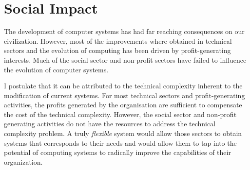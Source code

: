 \section{Social Impact}
The development of computer systems has had far reaching consequences on our
civilization. However, most of the improvements where obtained in technical
sectors and the evolution of computing has been driven by profit-generating
interests. Much of the social sector and non-profit sectors have failed to 
influence the evolution of computer systems.

I postulate that it can be attributed to the technical complexity inherent to
the modification of current systems. For most technical sectors and
profit-generating activities, the profits generated by the organisation are
sufficient to compensate the cost of the technical complexity. However, the
social sector and non-profit generating activities do not have the resources to
address the technical complexity problem.  A truly \textit{flexible} system
would allow those sectors to obtain systems that corresponds to their needs and
would allow them to tap into the potential of computing systems to radically
improve the capabilities of their organization.





